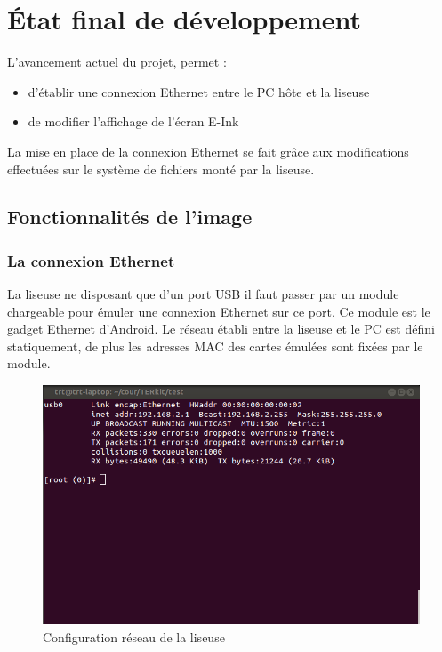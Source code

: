 \chapter{État final de développement}

L'avancement actuel du projet, permet : 
\begin{itemize}
	\item d'établir une connexion Ethernet entre le PC hôte et la liseuse
	\item de modifier l'affichage de l'écran E-Ink
\end{itemize}

La mise en place de la connexion Ethernet se fait grâce aux modifications effectuées sur le système de fichiers monté par la liseuse.

\section{Fonctionnalités de l'image} %

\subsection{La connexion Ethernet}
La liseuse ne disposant que d'un port USB il faut passer par un module chargeable pour émuler une connexion Ethernet sur ce port.
Ce module est le gadget Ethernet d'Android.
Le réseau établi entre la liseuse et le PC est défini statiquement, de plus les adresses MAC des cartes émulées sont fixées par le module.

\begin{figure}[]
	\begin{center}
	\includegraphics[scale=0.5]{capt_prs_ifconfig.png}	
	\end{center}
	\caption{Configuration réseau de la liseuse}
\end{figure}

